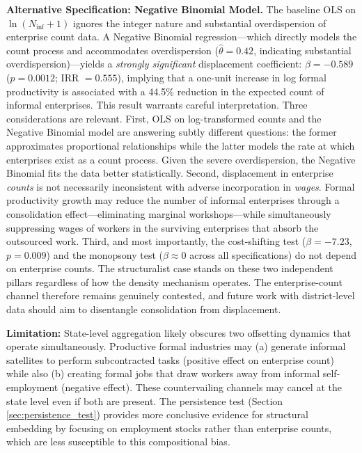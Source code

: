 \noindent \textbf{Alternative Specification: Negative Binomial Model.} The baseline OLS on $\ln(N_{\text{inf}} + 1)$ ignores the integer nature and substantial overdispersion of enterprise count data. A Negative Binomial regression—which directly models the count process and accommodates overdispersion ($\hat{\theta} = 0.42$, indicating substantial overdispersion)—yields a \textit{strongly significant} displacement coefficient: $\beta = -0.589$ ($p = 0.0012$; IRR $= 0.555$), implying that a one-unit increase in log formal productivity is associated with a 44.5\% reduction in the expected count of informal enterprises. This result warrants careful interpretation. Three considerations are relevant. First, OLS on log-transformed counts and the Negative Binomial model are answering subtly different questions: the former approximates proportional relationships while the latter models the rate at which enterprises exist as a count process. Given the severe overdispersion, the Negative Binomial fits the data better statistically. Second, displacement in enterprise \textit{counts} is not necessarily inconsistent with adverse incorporation in \textit{wages}. Formal productivity growth may reduce the number of informal enterprises through a consolidation effect—eliminating marginal workshops—while simultaneously suppressing wages of workers in the surviving enterprises that absorb the outsourced work. Third, and most importantly, the cost-shifting test ($\beta = -7.23$, $p = 0.009$) and the monopsony test ($\beta \approx 0$ across all specifications) do not depend on enterprise counts. The structuralist case stands on these two independent pillars regardless of how the density mechanism operates. The enterprise-count channel therefore remains genuinely contested, and future work with district-level data should aim to disentangle consolidation from displacement.

\noindent \textbf{Limitation:} State-level aggregation likely obscures two offsetting dynamics that operate simultaneously. Productive formal industries may (a) generate informal satellites to perform subcontracted tasks (positive effect on enterprise count) while also (b) creating formal jobs that draw workers away from informal self-employment (negative effect). These countervailing channels may cancel at the state level even if both are present. The persistence test (Section \ref{sec:persistence_test}) provides more conclusive evidence for structural embedding by focusing on employment stocks rather than enterprise counts, which are less susceptible to this compositional bias.

